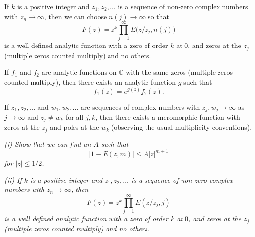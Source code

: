 \begin{theorem}[Weierstrass] If $k$ is a positive integer
and $z_{1},z_{2},\dots$ is a sequence of non-zero complex
numbers with $z_{n}\rightarrow\infty$, then we can choose
$n(j)\rightarrow\infty$ so that
\[F(z)=z^{k}\prod_{j=1}^{\infty}E\big(z/z_{j},n(j)\big)\]
is a well defined
analytic function with a zero of order $k$ at $0$,
and zeros at the $z_{j}$ (multiple zeros counted multiply)
and no others.
\end{theorem}
\begin{lemma} If $f_{1}$ and $f_{2}$ are analytic functions
on ${\mathbb C}$ with the same zeros (multiple zeros counted
multiply), then there exists an analytic function $g$
such that
\[f_{1}(z)=e^{g(z)}f_{2}(z).\]
\end{lemma}
\begin{lemma} If $z_{1},z_{2},\dots$ and $w_{1},w_{2},\dots$
are sequences of complex numbers with
$z_{j},w_{j}\rightarrow\infty$ as $j\rightarrow\infty$
and $z_{j}\neq w_{k}$ for all $j,k$, then there exists
a meromorphic function with zeros at the $z_{j}$
and poles at the $w_{k}$ (observing the usual multiplicity
conventions).
\end{lemma}
\emph{(i) Show that we can find an $A$ such that
\[|1-E(z,m)|\leq A|z|^{m+1}\]
for $|z|\leq 1/2$.}

\emph{(ii) If $k$ is a positive integer
and $z_{1},z_{2},\dots$ is a sequence of non-zero complex
numbers with $z_{n}\rightarrow\infty$, then
\[F(z)=z^{k}\prod_{j=1}^{\infty}E(z/z_{j},j)\]
is a well defined
analytic function with a zero of order $k$ at $0$,
and zeros at the $z_{j}$ (multiple zeros counted multiply)
and no others.}

